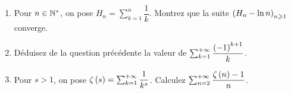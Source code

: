 \begin{corr}
\end{corr}

\begin{exo}~\\
\begin{enumerate}
    \item Pour \(n\in\mathbb{N}^*\), on pose \(H_n=\sum_{k=1}^n\dfrac{1}{k}\). Montrez que la suite \(\left(H_n-\ln n\right)_{n\geqslant1}\) converge. \\
    \item Déduisez de la question précédente la valeur de \(\sum_{k=1}^{+\infty}\dfrac{\left(-1\right)^{k+1}}{k}\). \\
    \item Pour \(s>1\), on pose \(\zeta\left(s\right)=\sum_{k=1}^{+\infty}\dfrac{1}{k^s}\). Calculez \(\sum_{n=2}^{+\infty}\dfrac{\zeta\left(n\right)-1}{n}\).
\end{enumerate}
\end{exo}

\begin{corr}
\end{corr}
